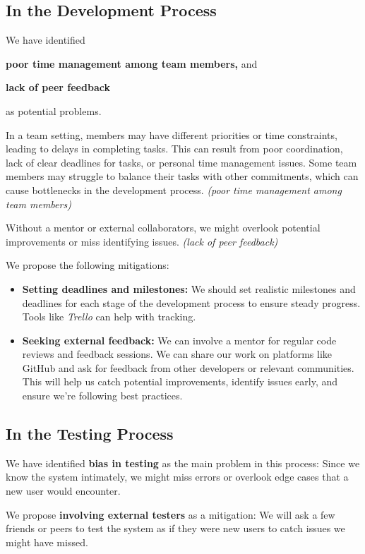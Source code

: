 \documentclass[a4paper,journal]{IEEEtran}
\begin{document}
\subsection{In the Development Process}
We have identified
\begin{enumerate*}
  \item \textbf{poor time management among team members,} and
  \item \textbf{lack of peer feedback}
\end{enumerate*}
as potential problems.

In a team setting, members may have different priorities or time constraints,
leading to delays in completing tasks.
This can result from poor coordination, lack of clear deadlines for tasks, or
personal time management issues.
Some team members may struggle to balance their tasks with other commitments,
which can cause bottlenecks in the development process.
\textit{(poor time management among team members)}

Without a mentor or external collaborators, we might overlook potential
improvements or miss identifying issues.
\textit{(lack of peer feedback)}

We propose the following mitigations:
\begin{itemize}
  \item \textbf{Setting deadlines and milestones:}
    We should set realistic milestones and deadlines for each stage of the
    development process to ensure steady progress.
    Tools like \textit{Trello} can help with tracking.
  \item \textbf{Seeking external feedback:}
    We can involve a mentor for regular code reviews and feedback sessions.
    We can share our work on platforms like GitHub and ask for feedback from
    other developers or relevant communities.
    This will help us catch potential improvements, identify issues early, and
    ensure we're following best practices.
\end{itemize}

\subsection{In the Testing Process}
We have identified \textbf{bias in testing} as the main problem in this
process:
Since we know the system intimately, we might miss errors or overlook edge cases
that a new user would encounter.

We propose \textbf{involving external testers} as a mitigation:
We will ask a few friends or peers to test the system as if they were new users
to catch issues we might have missed.
\end{document}
